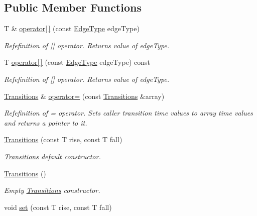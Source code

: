 \subsection*{Public Member Functions}
\begin{DoxyCompactItemize}
\item 
T \& \hyperlink{classTransitions_a79a4be6a8415710583c6c811a27c3b9d}{operator\mbox{[}$\,$\mbox{]}} (const \hyperlink{transitions_8h_a424a64da753a3cd5e96ab8d0553a04c4}{Edge\-Type} edge\-Type)
\begin{DoxyCompactList}\small\item\em Refefinition of \mbox{[}\mbox{]} operator. Returns value of edge\-Type. \end{DoxyCompactList}\item 
T \hyperlink{classTransitions_af9dddcc4c48658b8adf8739ac139c34f}{operator\mbox{[}$\,$\mbox{]}} (const \hyperlink{transitions_8h_a424a64da753a3cd5e96ab8d0553a04c4}{Edge\-Type} edge\-Type) const 
\begin{DoxyCompactList}\small\item\em Refefinition of \mbox{[}\mbox{]} operator. Returns value of edge\-Type. \end{DoxyCompactList}\item 
\hyperlink{classTransitions}{Transitions} \& \hyperlink{classTransitions_a280ca4245034d6f298935392f8172cea}{operator=} (const \hyperlink{classTransitions}{Transitions} \&array)
\begin{DoxyCompactList}\small\item\em Refefinition of = operator. Sets caller transition time values to array time values and returns a pointer to it. \end{DoxyCompactList}\item 
\hyperlink{classTransitions_a0aae6de65968e98353b1fd9b6f394221}{Transitions} (const T rise, const T fall)
\begin{DoxyCompactList}\small\item\em \hyperlink{classTransitions}{Transitions} default constructor. \end{DoxyCompactList}\item 
\hyperlink{classTransitions_a5eb22fbf6b9a14410efc696742ee34df}{Transitions} ()
\begin{DoxyCompactList}\small\item\em Empty \hyperlink{classTransitions}{Transitions} constructor. \end{DoxyCompactList}\item 
void \hyperlink{classTransitions_aa237e34f678bd0aae62be692dc4059dc}{set} (const T rise, const T fall)

\end{DoxyCompactItemize}
